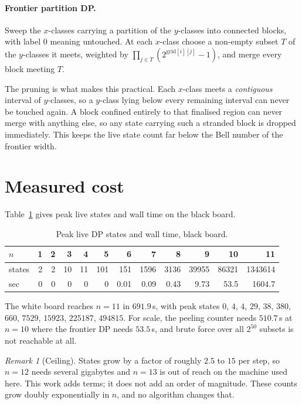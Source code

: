 \documentclass[11pt]{article}
\theoremstyle{remark}
\newtheorem{remark}{Remark}
\begin{document}
\paragraph{Frontier partition DP.}
Sweep the $x$-classes carrying a partition of the $y$-classes into connected
blocks, with label $0$ meaning untouched. At each $x$-class choose a non-empty
subset $T$ of the $y$-classes it meets, weighted by
$\prod_{j \in T} (2^{\mathrm{grid}[i][j]} - 1)$, and merge every block meeting
$T$.

The pruning is what makes this practical. Each $x$-class meets a
\emph{contiguous} interval of $y$-classes, so a $y$-class lying below every
remaining interval can never be touched again. A block confined entirely to that
finalised region can never merge with anything else, so any state carrying such a
stranded block is dropped immediately. This keeps the live state count far below
the Bell number of the frontier width.

\section{Measured cost}

Table~\ref{tab:cost} gives peak live states and wall time on the black board.

\begin{table}[h]
\centering
\begin{tabular}{lrrrrrrrrrrr}
\toprule
$n$ & 1 & 2 & 3 & 4 & 5 & 6 & 7 & 8 & 9 & 10 & 11 \\
\midrule
states & 2 & 2 & 10 & 11 & 101 & 151 & 1596 & 3136 & 39955 & 86321 & 1343614 \\
sec    & 0 & 0 & 0  & 0  & 0   & 0.01 & 0.09 & 0.43 & 9.73 & 53.5  & 1604.7 \\
\bottomrule
\end{tabular}
\caption{Peak live DP states and wall time, black board.}
\label{tab:cost}
\end{table}

The white board reaches $n=11$ in $691.9$\,s, with peak states
$0$, $4$, $4$, $29$, $38$, $380$, $660$, $7529$, $15923$, $225187$, $494815$.
For scale, the peeling
counter needs $510.7$\,s at $n=10$ where the frontier DP needs $53.5$\,s, and
brute force over all $2^{50}$ subsets is not reachable at all.

\begin{remark}[Ceiling]
States grow by a factor of roughly $2.5$ to $15$ per step, so $n=12$ needs
several gigabytes and $n=13$ is out of reach on the machine used here. This work
adds terms; it does not add an order of magnitude. These counts grow doubly
exponentially in $n$, and no algorithm changes that.
\end{remark}
\end{document}
